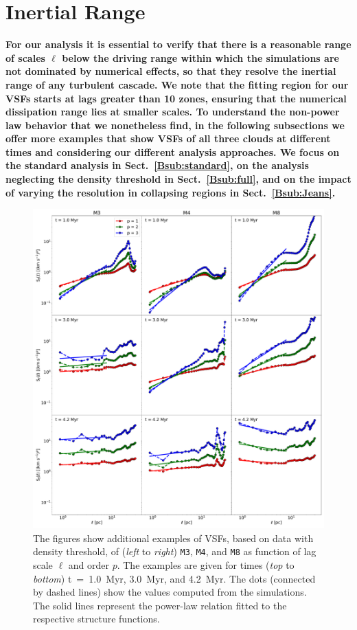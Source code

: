
\section{Inertial Range}\label{appInertial}


\textbf{
For our analysis it is essential to verify that there is a reasonable range of scales $\ell$ below the driving range within which the simulations are not dominated by numerical effects, so that they resolve the inertial range of any turbulent cascade.  
We note that the fitting region for our VSFs starts at lags greater than 10 zones, ensuring that the numerical dissipation range lies at smaller scales.
To understand the non-power law behavior that we nonetheless find, in the following subsections we offer more examples that show VSFs of all three clouds at different times and considering our different analysis approaches. 
We focus on the standard analysis in Sect.~\ref{Bsub:standard}, on the
analysis neglecting the density threshold in Sect.~\ref{Bsub:full},
and on the impact of varying the resolution in collapsing regions in Sect.~\ref{Bsub:Jeans}.
}
 	
\begin{figure}
    \centering
    \includegraphics[width=\textwidth]{app_examples_wthres_s_l.pdf}
    \caption{
        The figures show additional examples of VSFs, based on data with density threshold, of (\textit{left} to \textit{right}) \texttt{M3}, \texttt{M4}, and \texttt{M8} as function of lag scale $\ell$ and order $p$. 
        The examples are given for times (\textit{top} to \textit{bottom}) t~=~1.0~Myr, 3.0~Myr, and 4.2~Myr.
        The dots (connected by dashed lines) show the values computed from the simulations. 
        The solid lines represent the power-law relation fitted to the respective structure functions.
    }
    \label{pic:appInertial:examples_with_threshold_s_vs_l}
\end{figure}
 	
